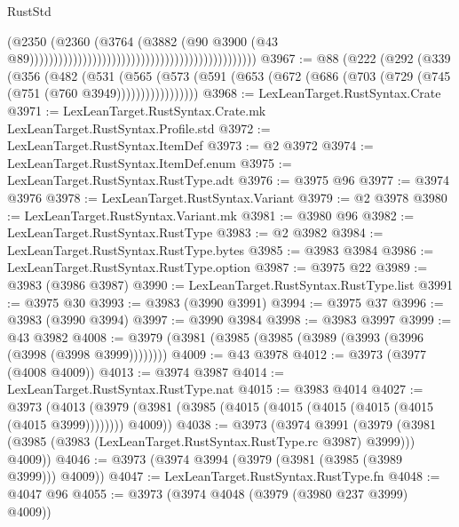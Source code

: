 \begin{lexlean}{RustStd}
\begin{coremodule}
                                                                                      (@2350
                                                                                        (@2360
                                                                                          (@3764
                                                                                            (@3882
                                                                                              (@90
                                                                                                @3900
                                                                                                (@43
                                                                                                  @89)))))))))))))))))))))))))))))))))))))))))))))))
@3967 := @88
    (@222
      (@292
        (@339
          (@356
            (@482
              (@531
                (@565
                  (@573 (@591 (@653 (@672 (@686 (@703 (@729 (@745 (@751 (@760 @3949)))))))))))))))))
@3968 := LexLeanTarget.RustSyntax.Crate
@3971 := LexLeanTarget.RustSyntax.Crate.mk LexLeanTarget.RustSyntax.Profile.std
@3972 := LexLeanTarget.RustSyntax.ItemDef
@3973 := @2 @3972
@3974 := LexLeanTarget.RustSyntax.ItemDef.enum
@3975 := LexLeanTarget.RustSyntax.RustType.adt
@3976 := @3975 @96
@3977 := @3974 @3976
@3978 := LexLeanTarget.RustSyntax.Variant
@3979 := @2 @3978
@3980 := LexLeanTarget.RustSyntax.Variant.mk
@3981 := @3980 @96
@3982 := LexLeanTarget.RustSyntax.RustType
@3983 := @2 @3982
@3984 := LexLeanTarget.RustSyntax.RustType.bytes
@3985 := @3983 @3984
@3986 := LexLeanTarget.RustSyntax.RustType.option
@3987 := @3975 @22
@3989 := @3983 (@3986 @3987)
@3990 := LexLeanTarget.RustSyntax.RustType.list
@3991 := @3975 @30
@3993 := @3983 (@3990 @3991)
@3994 := @3975 @37
@3996 := @3983 (@3990 @3994)
@3997 := @3990 @3984
@3998 := @3983 @3997
@3999 := @43 @3982
@4008 := @3979 (@3981 (@3985 (@3985 (@3989 (@3993 (@3996 (@3998 (@3998 @3999))))))))
@4009 := @43 @3978
@4012 := @3973 (@3977 (@4008 @4009))
@4013 := @3974 @3987
@4014 := LexLeanTarget.RustSyntax.RustType.nat
@4015 := @3983 @4014
@4027 := @3973
    (@4013 (@3979 (@3981 (@3985 (@4015 (@4015 (@4015 (@4015 (@4015 (@4015 @3999)))))))) @4009))
@4038 := @3973
    (@3974
      @3991
      (@3979 (@3981 (@3985 (@3983 (LexLeanTarget.RustSyntax.RustType.rc @3987) @3999))) @4009))
@4046 := @3973 (@3974 @3994 (@3979 (@3981 (@3985 (@3989 @3999))) @4009))
@4047 := LexLeanTarget.RustSyntax.RustType.fn
@4048 := @4047 @96
@4055 := @3973 (@3974 @4048 (@3979 (@3980 @237 @3999) @4009))

\end{coremodule}
\end{lexlean}
